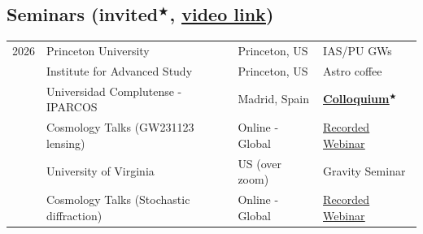 \documentclass[11pt,a4paper]{article}
\begin{document}
\subsection*{Seminars \hfill {\small \sf  (invited$^\bigstar$, \href{https://miguelzumalacarregui.es/talks.html}{\underline{video link}})} } %
\vspace{-.3cm}
\begin{longtable}{l p{} p{3.5cm} p{3cm}}
2026 & Princeton University &  Princeton, US  & IAS/PU GWs \\
& Institute for Advanced Study & Princeton, US & Astro coffee \\
& Universidad Complutense - IPARCOS & Madrid, Spain & \textbf{\href{https://www.youtube.com/watch?v=VsK5Omc99DU}{\underline{Colloquium}}}$^\bigstar$ \\
 & Cosmology Talks (GW231123 lensing) & Online - Global & \href{https://youtu.be/ZGqOpDTL8k4?si=HyzJFQFJTZk-vvVy}{\underline{Recorded Webinar}} \\
 & University of Virginia &  US (over zoom) & Gravity Seminar \\
 & Cosmology Talks (Stochastic diffraction) & Online - Global & \href{https://youtu.be/a5lIDTDRo4c}{\underline{Recorded Webinar}} \\


\end{longtable}
\end{document}
